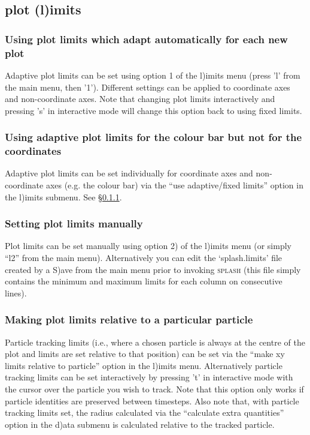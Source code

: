 \documentclass[a4paper,10pt]{article}
\newcommand{\splash}{\textsc{splash }}
\begin{document}
\subsection{plot (l)imits}%

\subsubsection{ Using plot limits which adapt automatically for each new plot}
\label{sec:adapt}
 Adaptive plot limits can be set using option 1 of the l)imits menu (press 'l' from the main menu, then '1'). Different settings can be applied to coordinate axes and non-coordinate axes. Note that changing plot limits interactively and pressing 's' in interactive mode will change this option back to using fixed limits.

\subsubsection{ Using adaptive plot limits for the colour bar but not for the coordinates}
 Adaptive plot limits can be set individually for coordinate axes and non-coordinate axes (e.g. the colour bar) via the ``use adaptive/fixed limits'' option in the l)imits submenu. See \S\ref{sec:adapt}. 

\subsubsection{ Setting plot limits manually}
 Plot limits can be set manually using option 2) of the l)imits menu (or simply ``l2'' from the main menu). Alternatively you can edit the `splash.limits' file created by a S)ave from the main menu prior to invoking \splash (this file simply contains the minimum and maximum limits for each column on consecutive lines).

\subsubsection{ Making plot limits relative to a particular particle}
\label{sec:track}
 Particle tracking limits (i.e., where a chosen particle is always at the centre of the plot and limits are set relative to that position) can be set via the ``make xy limits relative to particle'' option in the l)imits menu. Alternatively particle tracking limits can be set interactively by pressing 't' in interactive mode with the cursor over the particle you wish to track. Note that this option only works if particle identities are preserved between timesteps. Also note that, with particle tracking limits set, the radius calculated via the ``calculate extra quantities'' option in the d)ata submenu is calculated relative to the tracked particle.
\end{document}
